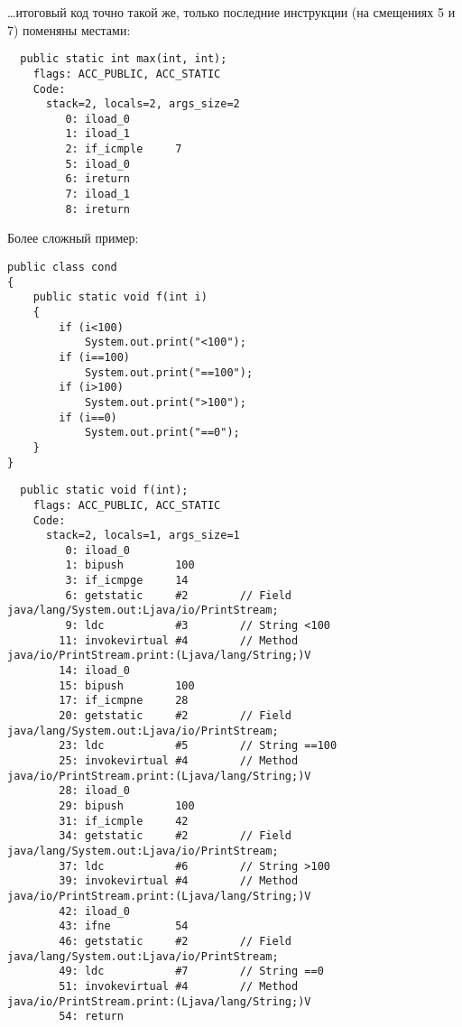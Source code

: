 \dots итоговый код точно такой же, только последние инструкции  
(на смещениях 5 и 7) поменяны местами:

\begin{lstlisting}
  public static int max(int, int);
    flags: ACC_PUBLIC, ACC_STATIC
    Code:
      stack=2, locals=2, args_size=2
         0: iload_0       
         1: iload_1       
         2: if_icmple     7
         5: iload_0       
         6: ireturn       
         7: iload_1       
         8: ireturn       
\end{lstlisting}

Более сложный пример:

\begin{lstlisting}[style=customjava]
public class cond
{
	public static void f(int i)
	{
		if (i<100)
			System.out.print("<100");
		if (i==100)
			System.out.print("==100");
		if (i>100)
			System.out.print(">100");
		if (i==0)
			System.out.print("==0");
	}
}
\end{lstlisting}

\begin{lstlisting}
  public static void f(int);
    flags: ACC_PUBLIC, ACC_STATIC
    Code:
      stack=2, locals=1, args_size=1
         0: iload_0       
         1: bipush        100
         3: if_icmpge     14
         6: getstatic     #2        // Field java/lang/System.out:Ljava/io/PrintStream;
         9: ldc           #3        // String <100
        11: invokevirtual #4        // Method java/io/PrintStream.print:(Ljava/lang/String;)V
        14: iload_0       
        15: bipush        100
        17: if_icmpne     28
        20: getstatic     #2        // Field java/lang/System.out:Ljava/io/PrintStream;
        23: ldc           #5        // String ==100
        25: invokevirtual #4        // Method java/io/PrintStream.print:(Ljava/lang/String;)V
        28: iload_0       
        29: bipush        100
        31: if_icmple     42
        34: getstatic     #2        // Field java/lang/System.out:Ljava/io/PrintStream;
        37: ldc           #6        // String >100
        39: invokevirtual #4        // Method java/io/PrintStream.print:(Ljava/lang/String;)V
        42: iload_0       
        43: ifne          54
        46: getstatic     #2        // Field java/lang/System.out:Ljava/io/PrintStream;
        49: ldc           #7        // String ==0
        51: invokevirtual #4        // Method java/io/PrintStream.print:(Ljava/lang/String;)V
        54: return        
\end{lstlisting}

